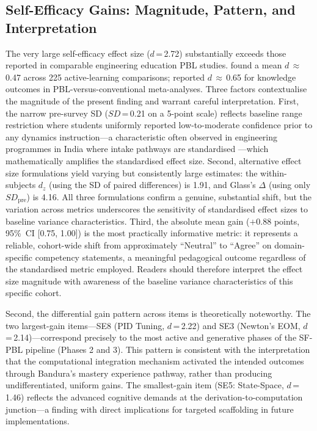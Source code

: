 \documentclass[utf8]{FrontiersinHarvard}
\begin{document}
\subsection{Self-Efficacy Gains: Magnitude, Pattern, and Interpretation}

The very large self-efficacy effect size ($d$\,=\,2.72) substantially
exceeds those reported in comparable engineering education PBL studies.
\citet{freeman2014active} found a mean $d$\,$\approx$\,0.47 across 225
active-learning comparisons; \citet{dochy2003effects} reported
$d$\,$\approx$\,0.65 for knowledge outcomes in PBL-versus-conventional
meta-analyses. Three factors contextualise the magnitude of the present
finding and warrant careful interpretation. First, the narrow pre-survey
SD ($SD$\,=\,0.21 on a 5-point scale) reflects baseline range
restriction where students uniformly reported low-to-moderate confidence
prior to any dynamics instruction---a characteristic often observed in
engineering programmes in India where intake pathways are
standardised \citep{streveler2008learning}---which mathematically amplifies
the standardised effect size. Second, alternative effect size formulations
yield varying but consistently large estimates: the within-subjects
$d_z$ (using the SD of paired differences) is 1.91, and Glass's
$\Delta$ (using only $SD_{\text{pre}}$) is 4.16. All three formulations
confirm a genuine, substantial shift, but the variation across metrics
underscores the sensitivity of standardised effect sizes to baseline
variance characteristics. Third, the absolute mean gain ($+$0.88 points,
95\%~CI [0.75, 1.00]) is the most practically informative metric:
it represents a reliable, cohort-wide shift from approximately ``Neutral''
to ``Agree'' on domain-specific competency statements, a meaningful
pedagogical outcome regardless of the standardised metric employed.
Readers should therefore interpret the effect size magnitude with awareness
of the baseline variance characteristics of this specific cohort.

Second, the differential gain pattern across items is theoretically
noteworthy. The two largest-gain items---SE8 (PID Tuning, $d$\,=\,2.22)
and SE3 (Newton's EOM, $d$\,=\,2.14)---correspond precisely to the most
active and generative phases of the SF-PBL pipeline (Phases 2 and 3).
This pattern is consistent with the interpretation that the computational
integration mechanism activated the intended outcomes through Bandura's
\citeyearpar{bandura1997self} mastery experience pathway, rather than
producing undifferentiated, uniform gains.
The smallest-gain item (SE5: State-Space, $d$\,=\,1.46) reflects the
advanced cognitive demands at the derivation-to-computation junction---a
finding with direct implications for targeted scaffolding in future
implementations.
\end{document}
